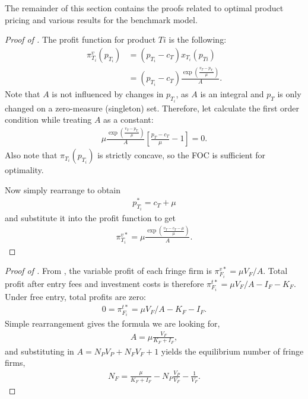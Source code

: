 The remainder of this section contains the proofs related to optimal product pricing and various results for the benchmark model.

\begin{proof}[Proof of ]
    The profit function for product $Ti$ is the following:
    \begin{align*}
        \pi^v_{T_i}(p_{T_i}) &= (p_{T_i} - c_T) x_{T_i}(p_{Ti}) \\
        &= (p_{T_i} - c_T) \frac{\exp\left( \frac{v_T - p_{T_i}}{\mu} \right)}{A}.
    \end{align*}
    Note that $A$ is not influenced by changes in $p_{T_i}$, as $A$ is an integral and $p_T$ is only changed on a zero-measure (singleton) set.
    Therefore, let calculate the first order condition while treating $A$ as a constant:
    \begin{align}
        \mu \frac{\exp\left( \frac{v_T - p_{T_i}}{\mu} \right)}{A} \left[ \frac{p_T - c_T}{\mu} - 1 \right] = 0.
        \label{eq:foc_profit}
    \end{align}
    Also note that $\pi_{T_i}(p_{T_i})$ is strictly concave, so the FOC is sufficient for optimality.

    Now simply rearrange  to obtain
    \begin{align*}
        p_{T_i}^* = c_T + \mu
    \end{align*}
    and substitute it into the profit function to get
    \begin{align*}
        \pi_{T_i}^{v*} = \mu \frac{\exp \left( \frac{v_T - c_T - \mu}{\mu} \right)}{A}.
    \end{align*}
\end{proof}

\begin{proof}[Proof of ]
    From , the variable profit of each fringe firm is $\pi_{F_i}^{v*} = \mu V_F / A$.
    Total profit after entry fees and investment costs is therefore $\pi_{F_i}^{t*} = \mu V_F / A - I_F - K_F$.
    Under free entry, total profits are zero:
    \begin{align*}
        0 = \pi_{F_i}^{t*} = \mu V_F / A - K_F - I_F.
    \end{align*}
    Simple rearrangement gives the formula we are looking for,
    \begin{align*}
        A = \mu \frac{V_F}{K_F + I_F},
    \end{align*}
    and substituting in $A = N_P V_P + N_F V_F + 1$ yields the equilibrium number of fringe firms,
    \begin{align*}
        N_F = \frac{\mu}{K_F + I_F} - N_P \frac{V_P}{V_F} - \frac{1}{V_F}.
    \end{align*}
\end{proof}

